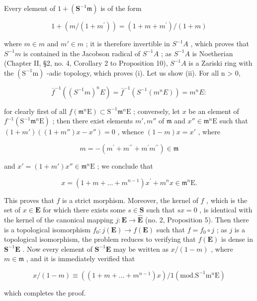 Every element of \(1 + (\mathbf{S}^{-1}\mathfrak{m})\) is of the form

\[
1 + (m / \left(1 + m ^ {\prime}\right)) = (1 + m + m ^ {\prime}) / (1 + m)
\]

where \(m \in m\) and \(m' \in m\) ; it is therefore invertible in \(S^{-1}A\) , which proves that \(S^{-1}m\) is contained in the Jacobson radical of \(S^{-1}A\) ; as \(S^{-1}A\) is Noetherian (Chapter II, §2, no. 4, Corollary 2 to Proposition 10), \(S^{-1}A\) is a Zariski ring with the \((\mathrm{S}^{-1}\mathrm{m})\) -adic topology, which proves (i). Let us show (ii). For all n \textgreater{} 0,

\[
\bar {f} ^ {- 1} ((S ^ {- 1} m) ^ {n} E) = \bar {f} ^ {- 1} (S ^ {- 1} (m ^ {n} E)) = m ^ {n} E:
\]

for clearly first of all \(f(\mathfrak{m}^n\mathrm{E}) \subset \mathrm{S}^{-1}\mathfrak{m}^n\mathrm{E}\) ; conversely, let \(x\) be an element of \(f^{-1}(\mathrm{S}^{-1}\mathfrak{m}^n\mathrm{E})\) ; then there exist elements \(m', m''\) of \(\mathfrak{m}\) and \(x'' \in \mathfrak{m}^n\mathrm{E}\) such that \((1 + m')((1 + m'')x - x'') = 0\) , whence \((1 - m)x = x'\) , where

\[
m = - \left(m ^ {\prime} + m ^ {\prime \prime} + m ^ {\prime} m ^ {\prime \prime}\right) \in \mathfrak {m}
\]

and \(x' = (1 + m')x'' \in \mathfrak{m}^n\mathrm{E}\) ; we conclude that

\[
x = (1 + m + \dots + m ^ {n - 1}) x ^ {\prime} + m ^ {n} x \in \mathfrak {m} ^ {n} \mathrm{E}.
\]

This proves that \(f\) is a strict morphism. Moreover, the kernel of \(f\) , which is the set of \(x \in \mathbf{E}\) for which there exists some \(s \in \mathbf{S}\) such that \(sx = 0\) , is identical with the kernel of the canonical mapping \(j: \mathbf{E} \to \hat{\mathbf{E}}\) (no. 2, Proposition 5). Then there is a topological isomorphism \(f_0: j(\mathbf{E}) \to f(\mathbf{E})\) such that \(f = f_0 \circ j\) ; as \(j\) is a topological isomorphism, the problem reduces to verifying that \(f(\mathbf{E})\) is dense in \(\mathbf{S}^{-1}\mathbf{E}\) . Now every element of \(\mathbf{S}^{-1}\mathbf{E}\) may be written as \(x / (1 - m)\) , where \(m \in \mathfrak{m}\) , and it is immediately verified that

\[
x / (1 - m) \equiv ((1 + m + \dots + m ^ {n - 1}) x) / 1 (\mathrm{mod.} \mathrm{S} ^ {- 1} \mathrm{m} ^ {n} \mathrm{E})
\]

which completes the proof.

